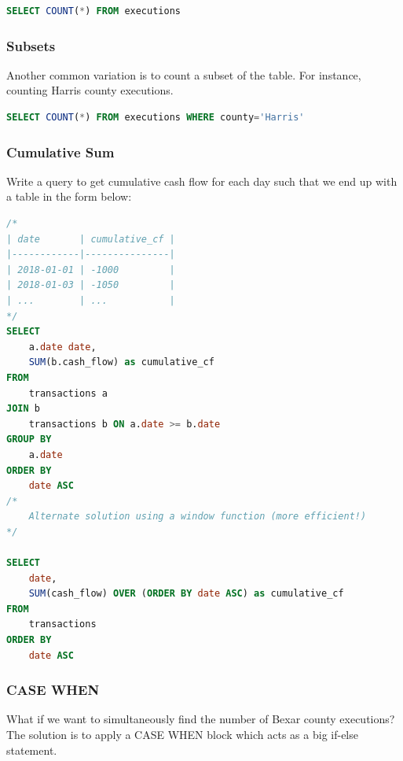 \documentclass{article}
\begin{document}
\vspace{8pt} \begin{lstlisting}[language=SQL]
SELECT COUNT(*) FROM executions
\end{lstlisting} \vspace{8pt}

\subsubsection{Subsets}
Another common variation is to count a subset of the table. For instance, counting Harris county executions.

\vspace{8pt} \begin{lstlisting}[language=SQL]
SELECT COUNT(*) FROM executions WHERE county='Harris'
\end{lstlisting} \vspace{8pt}

\subsubsection{Cumulative Sum}

Write a query to get cumulative cash flow for each day such that we end up with a table in the form below: 

\vspace{8pt} \begin{lstlisting}[language=SQL]
/*
| date       | cumulative_cf |
|------------|---------------|
| 2018-01-01 | -1000         |
| 2018-01-03 | -1050         |
| ...        | ...           |
*/
SELECT 
    a.date date, 
    SUM(b.cash_flow) as cumulative_cf 
FROM
    transactions a
JOIN b 
    transactions b ON a.date >= b.date 
GROUP BY 
    a.date 
ORDER BY 
    date ASC
/* 
    Alternate solution using a window function (more efficient!)
*/

SELECT 
    date, 
    SUM(cash_flow) OVER (ORDER BY date ASC) as cumulative_cf 
FROM
    transactions 
ORDER BY 
    date ASC
\end{lstlisting} \vspace{8pt}

\subsubsection{CASE WHEN }

What if we want to simultaneously find the number of Bexar county executions? The solution is to apply a CASE WHEN block which acts as a big if-else statement.
\end{document}
